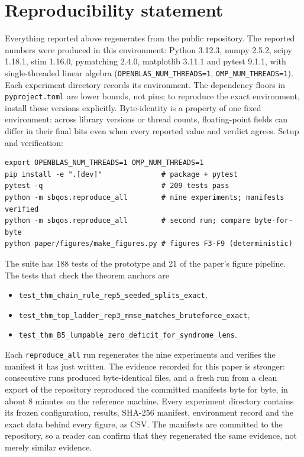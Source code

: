 \section{Reproducibility statement}
\label{sec:repro}

Everything reported above regenerates from the public repository. The reported numbers were produced in this environment: Python 3.12.3, numpy 2.5.2, scipy 1.18.1, stim 1.16.0, pymatching 2.4.0, matplotlib 3.11.1 and pytest 9.1.1, with single-threaded linear algebra (\texttt{OPENBLAS\_NUM\_THREADS=1}, \texttt{OMP\_NUM\_THREADS=1}). Each experiment directory records its environment. %
The dependency floors in \texttt{pyproject.toml} are lower bounds, not pins; to reproduce the exact environment, install these versions explicitly. Byte-identity is a property of one fixed environment: across library versions or thread counts, floating-point fields can differ in their final bits even when every reported value and verdict agrees. %
Setup and verification:

\begin{verbatim}
export OPENBLAS_NUM_THREADS=1 OMP_NUM_THREADS=1
pip install -e ".[dev]"              # package + pytest
pytest -q                            # 209 tests pass
python -m sbqos.reproduce_all        # nine experiments; manifests verified
python -m sbqos.reproduce_all        # second run; compare byte-for-byte
python paper/figures/make_figures.py # figures F3-F9 (deterministic)
\end{verbatim}

The suite has 188 tests of the prototype and 21 of the paper's figure pipeline. %
The tests that check the theorem anchors are %
\begin{itemize}[nosep]
\item \texttt{test\_thm\_chain\_rule\_rep5\_seeded\_splits\_exact},
\item \texttt{test\_thm\_top\_ladder\_rep3\_mmse\_matches\_bruteforce\_exact},
\item \texttt{test\_thm\_B5\_lumpable\_zero\_deficit\_for\_syndrome\_lens}.
\end{itemize}
Each \texttt{reproduce\_all} run regenerates the nine experiments and verifies the manifest it has just written. The evidence recorded for this paper is stronger: consecutive runs produced byte-identical files, and a fresh run from a clean export of the repository reproduced the committed manifests byte for byte, in about 8 minutes on the reference machine. %
Every experiment directory contains its frozen configuration, results, SHA-256 manifest, environment record and the exact data behind every figure, as CSV. The manifests are committed to the repository, so a reader can confirm that they regenerated the same evidence, not merely similar evidence. %
